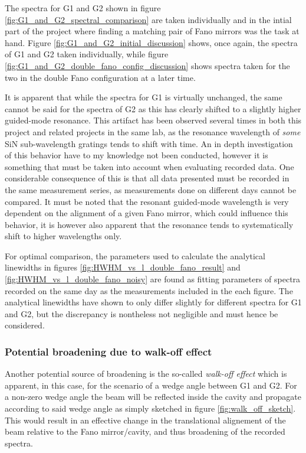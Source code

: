 The spectra for G1 and G2 shown in figure \ref{fig:G1_and_G2_spectral_comparison} are taken individually and in the intial part of the project where finding a matching pair of Fano mirrors was the task at hand. Figure \ref{fig:G1_and_G2_initial_discussion} shows, once again, the spectra of G1 and G2 taken individually, while figure \ref{fig:G1_and_G2_double_fano_config_discussion} shows spectra taken for the two in the double Fano configuration at a later time.

It is apparent that while the spectra for G1 is virtually unchanged, the same cannot be said for the spectra of G2 as this has clearly shifted to a slightly higher guided-mode resonance. This artifact has been observed several times in both this project and related projects in the same lab, as the resonance wavelength of \emph{some} SiN sub-wavelength gratings tends to shift with time. An in depth investigation of this behavior have to my knowledge not been conducted, however it is something that must be taken into account when evaluating recorded data. One considerable consequence of this is that all data presented must be recorded in the same measurement series, as measurements done on different days cannot be compared. It must be noted that the resonant guided-mode wavelength is very dependent on the alignment of a given Fano mirror, which could influence this behavior, it is however also apparent that the resonance tends to systematically shift to higher wavelengths only. 

For optimal comparison, the parameters used to calculate the analytical linewidths in figures \ref{fig:HWHM_vs_l_double_fano_result} and \ref{fig:HWHM_vs_l_double_fano_noisy} are found as fitting parameters of spectra recorded on the same day as the measurements included in the each figure. The analytical linewidths have shown to only differ slightly for different spectra for G1 and G2, but the discrepancy is nontheless not negligible and must hence be considered.

\subsubsection{Potential broadening due to walk-off effect}

Another potential source of broadening is the so-called \emph{walk-off effect} which is apparent, in this case, for the scenario of a wedge angle between G1 and G2. For a non-zero wedge angle the beam will be reflected inside the cavity and propagate according to said wedge angle as simply sketched in figure \ref{fig:walk_off_sketch}. This would result in an effective change in the translational alignement of the beam relative to the Fano mirror/cavity, and thus broadening of the recorded spectra.

